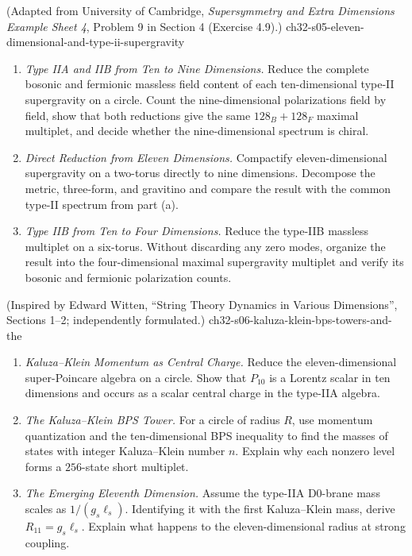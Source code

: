 \begin{enumerate}
    {(Adapted from University of Cambridge, \emph{Supersymmetry and Extra Dimensions Example Sheet 4}, Problem 9 in Section 4 (Exercise 4.9).)}
    {ch32-s05-eleven-dimensional-and-type-ii-supergravity}
  \begin{enumerate}
    \item \emph{Type IIA and IIB from Ten to Nine Dimensions.}
    Reduce the complete bosonic and fermionic massless field content of each
      ten-dimensional type-II supergravity on a circle.  Count the
      nine-dimensional polarizations field by field, show that both reductions
      give the same \(128_B+128_F\) maximal multiplet, and decide whether the
      nine-dimensional spectrum is chiral.
    \item \emph{Direct Reduction from Eleven Dimensions.}
    Compactify eleven-dimensional supergravity on a two-torus directly to
      nine dimensions.  Decompose the metric, three-form, and gravitino and
      compare the result with the common type-II spectrum from part (a).
    \item \emph{Type IIB from Ten to Four Dimensions.}
    Reduce the type-IIB massless multiplet on a six-torus.  Without discarding
      any zero modes, organize the result into the four-dimensional maximal
      supergravity multiplet and verify its bosonic and fermionic
      polarization counts.
  \end{enumerate}

    {(Inspired by Edward Witten, ``String Theory Dynamics in Various Dimensions'', Sections 1--2; independently formulated.)}
    {ch32-s06-kaluza-klein-bps-towers-and-the}
  \begin{enumerate}
    \item \emph{Kaluza--Klein Momentum as Central Charge.}
    Reduce the eleven-dimensional super-Poincare algebra on a circle.
      Show that \(P_{10}\) is a Lorentz scalar in ten dimensions and occurs
      as a scalar central charge in the type-IIA algebra.
    \item \emph{The Kaluza--Klein BPS Tower.}
    For a circle of radius \(R\), use momentum quantization and the
      ten-dimensional BPS inequality to find the masses of states with
      integer Kaluza--Klein number \(n\).  Explain why each nonzero level
      forms a \(256\)-state short multiplet.
    \item \emph{The Emerging Eleventh Dimension.}
    Assume the type-IIA D0-brane mass scales as
      \(1/(g_s\ell_s)\).  Identifying it with the first Kaluza--Klein mass,
      derive \(R_{11}=g_s\ell_s\).  Explain what happens to the
      eleven-dimensional radius at strong coupling.
  \end{enumerate}


\end{enumerate}

